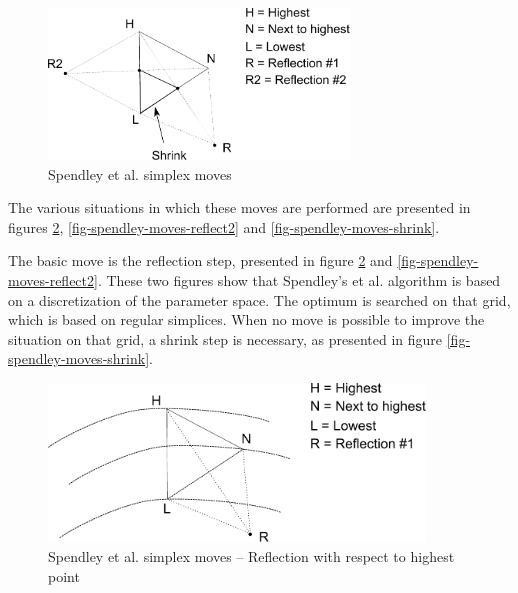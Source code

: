 \begin{figure}
\begin{center}
\includegraphics[width=8cm]{spendleymethod/spendley-steps.pdf}
\end{center}
\caption{Spendley et al. simplex moves}
\label{fig-spendley-moves}
\end{figure}

The various situations in which these moves are performed are 
presented in figures \ref{fig-spendley-moves-reflect}, \ref{fig-spendley-moves-reflect2}
and \ref{fig-spendley-moves-shrink}.

The basic move is the reflection step, presented in figure 
\ref{fig-spendley-moves-reflect} and \ref{fig-spendley-moves-reflect2}. 
These two figures show that Spendley's et al.
algorithm is based on a discretization of the parameter space. 
The optimum is searched on that grid, which is based on regular simplices.
When no move is possible to improve the situation on that grid,
a shrink step is necessary, as presented in figure \ref{fig-spendley-moves-shrink}.

\begin{figure}
\begin{center}
\includegraphics[width=10cm]{spendleymethod/spendley-steps-reflect.pdf}
\end{center}
\caption{Spendley et al. simplex moves -- Reflection with respect to highest point}
\label{fig-spendley-moves-reflect}
\end{figure}

